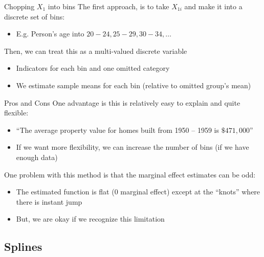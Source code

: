 \documentclass[aspectratio=169,t,11pt,table]{beamer}
\begin{document}
\begin{frame}{Chopping $X_1$ into bins}
  The first approach, is to take $X_{1i}$ and make it into a discrete set of bins:
  \begin{itemize}
    \item E.g. Person's age into $20-24, 25-29, 30-34, \dots$
  \end{itemize}

  \bigskip
  Then, we can treat this as a multi-valued discrete variable
  \begin{itemize}
    \item Indicators for each bin and one omitted category
    
    \item We estimate sample means for each bin (relative to omitted group's mean)
  \end{itemize}
\end{frame}


\begin{frame}{Pros and Cons}
  One advantage is this is relatively easy to explain and quite flexible:
  \begin{itemize}
    \item ``The average property value for homes built from 1950 -- 1959 is $\$471,000$''
    
    \item If we want more flexibility, we can increase the number of bins (if we have enough data)
  \end{itemize}

  \pause
  \bigskip
  One problem with this method is that the marginal effect estimates can be odd:
  \begin{itemize}
    \item The estimated function is flat (0 marginal effect) except at the ``\alert{knots}'' where there is instant jump
    
    \item But, we are okay if we recognize this limitation
  \end{itemize}
\end{frame}




\subsection{Splines}
\end{document}
